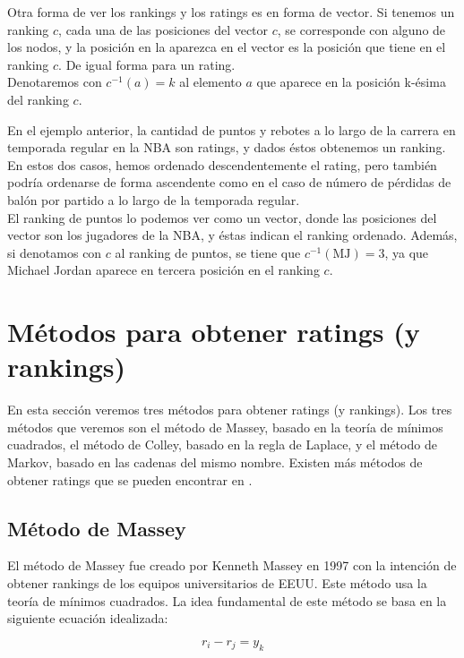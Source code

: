 Otra forma de ver los rankings y los ratings es en forma de vector. Si tenemos un ranking $c$, cada una de las posiciones del vector $c$, se corresponde con alguno de los nodos, y la posición en la aparezca en el vector es la posición que tiene en el ranking $c$. De igual forma para un rating.\\

Denotaremos con $c^{-1}(a) = k$ al elemento $a$ que aparece en la posición k-ésima del ranking $c$.

\begin{ejemplo}
En el ejemplo anterior, la cantidad de puntos y rebotes a lo largo de la carrera en temporada regular en la NBA son ratings, y dados éstos obtenemos un ranking. En estos dos casos, hemos ordenado descendentemente el rating, pero también podría ordenarse de forma ascendente como en el caso de número de pérdidas de balón por partido a lo largo de la temporada regular.\\

El ranking de puntos lo podemos ver como un vector, donde las posiciones del vector son los jugadores de la NBA, y éstas indican el ranking ordenado. Además,  si denotamos con $c$ al ranking de puntos, se tiene que $c^{-1}(\text{MJ}) = 3$, ya que Michael Jordan aparece en tercera posición en el ranking $c$.
\end{ejemplo} 

\section{Métodos para obtener ratings (y rankings)}
En esta sección veremos tres métodos para obtener ratings (y rankings). Los tres métodos que veremos son el método de Massey, basado en la teoría de mínimos cuadrados, el método de Colley, basado en la regla de Laplace, y el método de Markov, basado en las cadenas del mismo nombre. Existen más métodos de obtener ratings que se pueden encontrar en \cite{langville2012s}.

\subsection{Método de Massey}
El método de Massey fue creado por Kenneth Massey en 1997 con la intención de obtener rankings de los equipos universitarios de EEUU. Este método usa la teoría de mínimos cuadrados. La idea fundamental de este método se basa en la siguiente ecuación idealizada:

\begin{equation}
r_i - r_j = y_k
\end{equation} 

